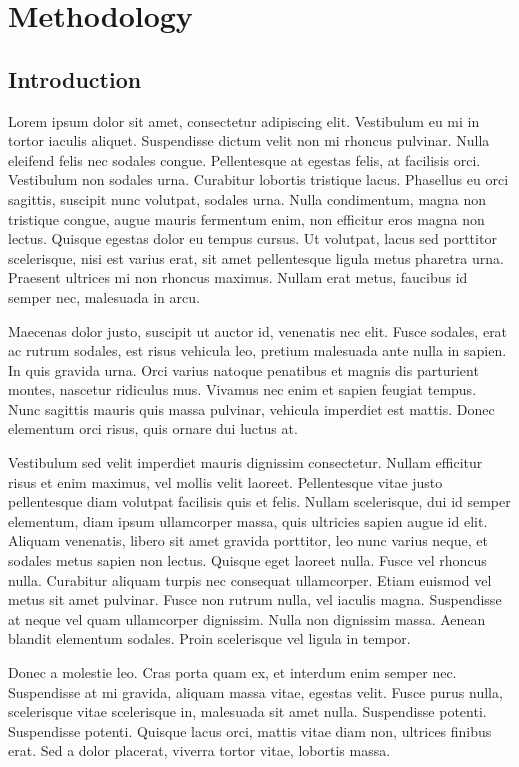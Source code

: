 \chapter{Methodology}
\label{chap:Methodology}
\section{Introduction}
\label{sec:MethIntro}
Lorem ipsum dolor sit amet, consectetur adipiscing elit. Vestibulum eu mi in tortor iaculis aliquet. Suspendisse dictum velit non mi rhoncus pulvinar. Nulla eleifend felis nec sodales congue. Pellentesque at egestas felis, at facilisis orci. Vestibulum non sodales urna. Curabitur lobortis tristique lacus. Phasellus eu orci sagittis, suscipit nunc volutpat, sodales urna. Nulla condimentum, magna non tristique congue, augue mauris fermentum enim, non efficitur eros magna non lectus. Quisque egestas dolor eu tempus cursus. Ut volutpat, lacus sed porttitor scelerisque, nisi est varius erat, sit amet pellentesque ligula metus pharetra urna. Praesent ultrices mi non rhoncus maximus. Nullam erat metus, faucibus id semper nec, malesuada in arcu.

Maecenas dolor justo, suscipit ut auctor id, venenatis nec elit. Fusce sodales, erat ac rutrum sodales, est risus vehicula leo, pretium malesuada ante nulla in sapien. In quis gravida urna. Orci varius natoque penatibus et magnis dis parturient montes, nascetur ridiculus mus. Vivamus nec enim et sapien feugiat tempus. Nunc sagittis mauris quis massa pulvinar, vehicula imperdiet est mattis. Donec elementum orci risus, quis ornare dui luctus at.

Vestibulum sed velit imperdiet mauris dignissim consectetur. Nullam efficitur risus et enim maximus, vel mollis velit laoreet. Pellentesque vitae justo pellentesque diam volutpat facilisis quis et felis. Nullam scelerisque, dui id semper elementum, diam ipsum ullamcorper massa, quis ultricies sapien augue id elit. Aliquam venenatis, libero sit amet gravida porttitor, leo nunc varius neque, et sodales metus sapien non lectus. Quisque eget laoreet nulla. Fusce vel rhoncus nulla. Curabitur aliquam turpis nec consequat ullamcorper. Etiam euismod vel metus sit amet pulvinar. Fusce non rutrum nulla, vel iaculis magna. Suspendisse at neque vel quam ullamcorper dignissim. Nulla non dignissim massa. Aenean blandit elementum sodales. Proin scelerisque vel ligula in tempor.

Donec a molestie leo. Cras porta quam ex, et interdum enim semper nec. Suspendisse at mi gravida, aliquam massa vitae, egestas velit. Fusce purus nulla, scelerisque vitae scelerisque in, malesuada sit amet nulla. Suspendisse potenti. Suspendisse potenti. Quisque lacus orci, mattis vitae diam non, ultrices finibus erat. Sed a dolor placerat, viverra tortor vitae, lobortis massa.

